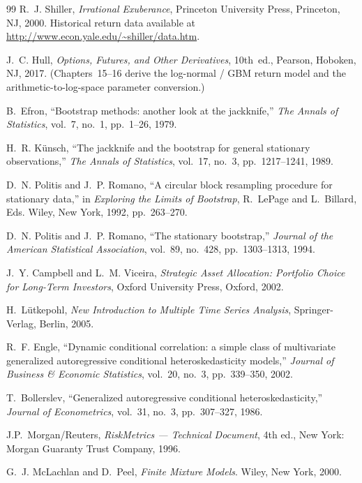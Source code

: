 \documentclass[fleqn,12pt]{report}
\begin{document}
\begin{thebibliography}{99}
R.~J. Shiller,
\textit{Irrational Exuberance},
Princeton University Press, Princeton, NJ, 2000.
Historical return data available at
\url{http://www.econ.yale.edu/~shiller/data.htm}.

J.~C. Hull,
\textit{Options, Futures, and Other Derivatives}, 10th~ed.,
Pearson, Hoboken, NJ, 2017.
(Chapters~15--16 derive the log-normal / GBM return model and the
arithmetic-to-log-space parameter conversion.)

B.~Efron,
``Bootstrap methods: another look at the jackknife,''
\textit{The Annals of Statistics}, vol.~7, no.~1, pp.~1--26, 1979.

H.~R. Künsch,
``The jackknife and the bootstrap for general stationary observations,''
\textit{The Annals of Statistics}, vol.~17, no.~3, pp.~1217--1241, 1989.

D.~N. Politis and J.~P. Romano,
``A circular block resampling procedure for stationary data,''
in \textit{Exploring the Limits of Bootstrap},
R.~LePage and L.~Billard, Eds.
Wiley, New York, 1992, pp.~263--270.

D.~N. Politis and J.~P. Romano,
``The stationary bootstrap,''
\textit{Journal of the American Statistical Association},
vol.~89, no.~428, pp.~1303--1313, 1994.

J.~Y. Campbell and L.~M. Viceira,
\textit{Strategic Asset Allocation: Portfolio Choice for Long-Term Investors},
Oxford University Press, Oxford, 2002.

H.~Lütkepohl,
\textit{New Introduction to Multiple Time Series Analysis},
Springer-Verlag, Berlin, 2005.

R.~F. Engle,
``Dynamic conditional correlation: a simple class of multivariate generalized
autoregressive conditional heteroskedasticity models,''
\textit{Journal of Business \& Economic Statistics},
vol.~20, no.~3, pp.~339--350, 2002.

T.~Bollerslev,
``Generalized autoregressive conditional heteroskedasticity,''
\textit{Journal of Econometrics}, vol.~31, no.~3, pp.~307--327, 1986.

J.P.~Morgan/Reuters,
\textit{RiskMetrics --- Technical Document}, 4th ed.,
New York: Morgan Guaranty Trust Company, 1996.

G.~J. McLachlan and D.~Peel,
\textit{Finite Mixture Models}.
Wiley, New York, 2000.


\end{thebibliography}
\end{document}
